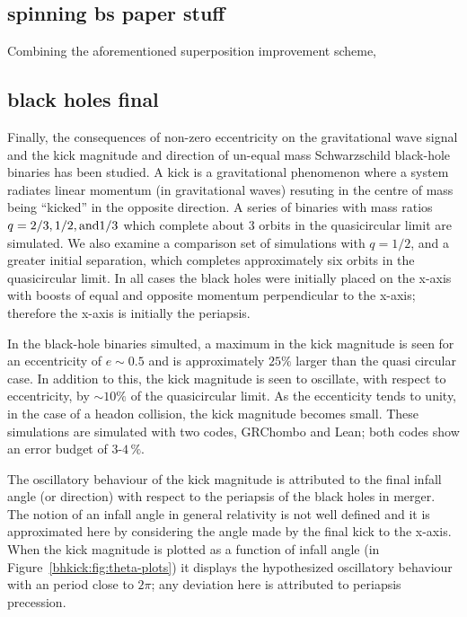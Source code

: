 \subsection{spinning bs paper stuff}

Combining the aforementioned superposition improvement scheme,



\subsection{black holes final}

Finally, the consequences of non-zero eccentricity on the gravitational wave signal
and the kick magnitude and direction
of un-equal mass Schwarzschild black-hole binaries has been studied. A kick is a
gravitational phenomenon where a system radiates linear momentum (in gravitational waves)
resuting in the centre of mass being \enquote{kicked} in the opposite direction. A series of
binaries with mass ratios $q=2/3, 1/2, {\rm and} 1/3$ which complete about 3 orbits
in the quasicircular limit are simulated. We also examine a comparison set of
simulations with $q=1/2$, and a greater initial
separation, which completes approximately six orbits in the quasicircular limit.
In all cases the black holes were initially placed on the x-axis with boosts of
equal and opposite momentum perpendicular to the x-axis; therefore the x-axis is
initially the periapsis.

In the black-hole binaries simulted, a maximum in the kick magnitude is seen for an eccentricity
of $e\sim 0.5$ and is approximately $25\%$ larger than the quasi circular case. In addition
to this, the kick magnitude is seen to oscillate, with respect to eccentricity, by
$\sim 10\%$ of the quasicircular limit. As the eccenticity tends to unity,
in the case of a headon collision, the kick magnitude becomes small. These simulations
are simulated with two codes, {\sc GRChombo} and {\sc Lean}; both codes show an error
budget of $3$-$4\,\%$.

The oscillatory behaviour of the kick magnitude is attributed to the final infall
angle (or direction) with respect to the periapsis of the black holes in merger.
The notion of an infall angle in
general relativity is not well defined and it is approximated here by considering the
angle made by the final kick to the x-axis. When the kick magnitude is plotted as a
function of infall angle (in Figure~\ref{bhkick:fig:theta-plots}) it displays the
hypothesized oscillatory behaviour with an period close to $2\pi$; any deviation
here is attributed to periapsis precession.

